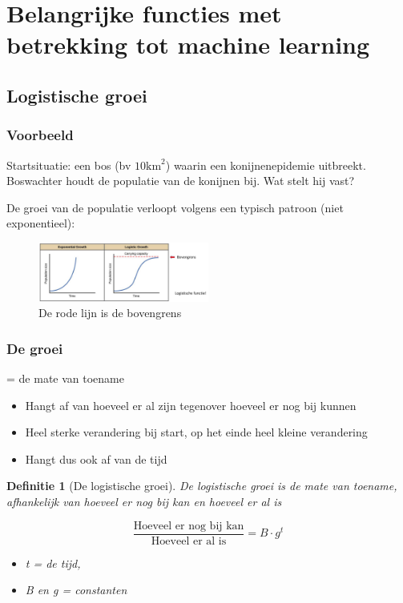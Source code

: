 \documentclass{article}
\newtheorem{theorem}{Definitie}[section]
\begin{document}
\section{Belangrijke functies met betrekking tot machine learning}

\subsection{Logistische groei}

\subsubsection{Voorbeeld}

Startsituatie: een bos (bv $\text{10km}^2$) waarin een konijnenepidemie uitbreekt.
Boswachter houdt de populatie van de konijnen bij. Wat stelt hij vast?

De groei van de populatie verloopt volgens een typisch patroon (niet exponentieel):

\begin{figure}[H]
    \centering
    \includegraphics[width=0.5\textwidth]{logistische-groei-vs-exponentieel.png}
    \caption{De rode lijn is de bovengrens}
\end{figure}

\subsubsection{De groei}

= de mate van toename

\begin{itemize}
    \item Hangt af van hoeveel er al zijn tegenover hoeveel er nog bij kunnen
    \item Heel sterke verandering bij start, op het einde heel kleine verandering
    \item Hangt dus ook af van de tijd
\end{itemize}

\begin{theorem}[De logistische groei]
De logistische groei is de mate van toename, afhankelijk van hoeveel er nog bij kan en hoeveel er al is

\begin{equation}
    \frac{\text{Hoeveel er nog bij kan}}{\text{Hoeveel er al is}} = B \cdot g^t
\end{equation}

\begin{itemize}
    \item t = de tijd,
    \item B en g = constanten
\end{itemize}


\end{theorem}
\end{document}

